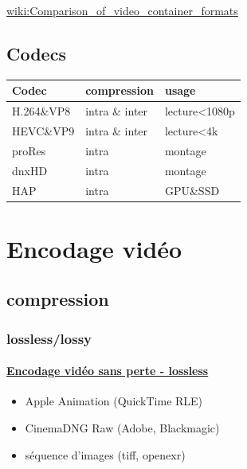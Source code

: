 \documentclass[
]{book}
\providecommand{\tightlist}{%
  \setlength{\itemsep}{0pt}\setlength{\parskip}{0pt}}
\begin{document}
\href{https://en.wikipedia.org/wiki/Comparison_of_video_container_formats}{wiki:Comparison\_of\_video\_container\_formats}

\hypertarget{codecs}{%
\subsection{Codecs}\label{codecs}}

\begin{longtable}[]{@{}lll@{}}
\toprule
Codec & compression & usage\tabularnewline
\midrule
\endhead
H.264\&VP8 & intra \& inter & lecture\textless1080p\tabularnewline
HEVC\&VP9 & intra \& inter & lecture\textless4k\tabularnewline
proRes & intra & montage\tabularnewline
dnxHD & intra & montage\tabularnewline
HAP & intra & GPU\&SSD\tabularnewline
\bottomrule
\end{longtable}

\hypertarget{encodage-viduxe9o}{%
\section{Encodage vidéo}\label{encodage-viduxe9o}}

\hypertarget{compression}{%
\subsection{compression}\label{compression}}

\hypertarget{losslesslossy}{%
\subsubsection{lossless/lossy}\label{losslesslossy}}

\hypertarget{encodage-viduxe9o-sans-perte---lossless}{%
\paragraph{\texorpdfstring{\href{https://en.wikipedia.org/wiki/List_of_codecs\#Lossless_video_compression}{Encodage vidéo sans perte - lossless}}{Encodage vidéo sans perte - lossless}}\label{encodage-viduxe9o-sans-perte---lossless}}

\begin{itemize}
\tightlist
\item
  Apple Animation (QuickTime RLE)
\item
  CinemaDNG Raw (Adobe, Blackmagic)
\item
  séquence d'images (tiff, openexr)
\end{itemize}
\end{document}
